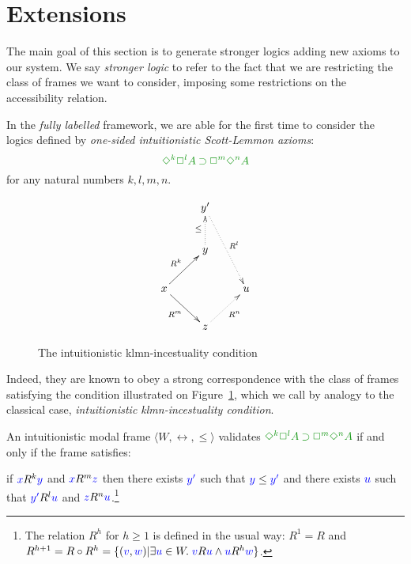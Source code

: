 \newcommand{\set}[1]{\{#1\}}

\section{Extensions}\label{sec:ext}

The main goal of this section is to generate stronger logics adding new axioms to our system. We say \emph{stronger logic} to refer to the fact that we are restricting the class of frames we want to consider, imposing some restrictions on the accessibility relation. 

In the \emph{fully labelled} framework, we are able for the first time to consider the logics defined by \emph{one-sided intuitionistic Scott-Lemmon axioms}:
\begin{equation}
\fm{\DIA^{k} \BOX^{l} A \IMP \BOX^{m}\DIA^{n} A}
\end{equation}
for any natural numbers $k,l,m,n$.

\begin{figure}
	$$
	\xymatrix{
		& y' \ar@{.>}[ddr]^{R^l} \\
		& y \ar@{.>}[u]^{\le} \\
		x \ar@{->}[ur]^{R^k}\ar@{->}[dr]_{R^m} && u \\
		& z \ar@{.>}[ur]_{R^n}
	}
	$$
	\caption{The intuitionistic klmn-incestuality condition}
	\label{fig:gklmn}
\end{figure}

Indeed, they are known to obey a strong correspondence with the class of frames satisfying the condition illustrated on Figure~\ref{fig:gklmn}, which we call by analogy to the classical case, \emph{intuitionistic klmn-incestuality condition}.

\begin{theorem}\label{thm:gklmn-correspondence}
	An intuitionistic modal frame $\langle W, \rel, \le \rangle$ validates $\fm{\DIA^k\BOX^l A \IMP \BOX^m\DIA^n A}$ if and only if the frame satisfies:
	
	if ${\color{blue}{x}} R^{k} {\color{blue}{y}}$ and ${\color{blue}{x}} R^{m} {\color{blue}{z}}$ then there exists ${\color{blue}{y'}}$ such that ${\color{blue}{y}}\le{{\color{blue}{y'}}}$ and there exists ${\color{blue}{u}}$ such that ${\color{blue}{y'}}R^{l}{\color{blue}{u}}$ and ${\color{blue}{z}} R^{n} {\color{blue}{u}}$.\footnote{The relation $R^h$ for $h\ge1$ is defined in the usual way: $R^1=R$ and $R^{h+1}=R\circ R^h=\set{(\lb v,\lb w)|\exists \lb u\in W.\; \lb vR\lb u \wedge \lb uR^h\lb w}$.}
\end{theorem}

